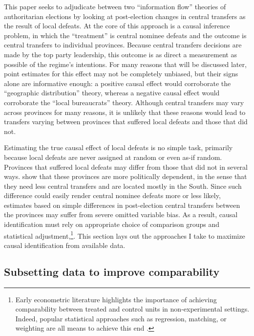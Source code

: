 \documentclass[12pt]{article}\usepackage[]{graphicx}\usepackage[]{color}
\newcommand{\1}{\mathbbm{1}}
\begin{document}
This paper seeks to adjudicate between two ``information flow'' theories of authoritarian elections by looking at post-election changes in central transfers as the result of local defeats. At the core of this approach is a causal inference problem, in which the ``treatment'' is central nominee defeats and the outcome is central transfers to individual provinces. Because central transfers decisions are made by the top party leadership, this outcome is as direct a measurement as possible of the regime's intentions. For many reasons that will be discussed later, point estimates for this effect may not be completely unbiased, but their signs alone are informative enough: a positive causal effect would corroborate the ``geographic distribution'' theory, whereas a negative causal effect would corroborate the ``local bureaucrats'' theory. Although central transfers may vary across provinces for many reasons, it is unlikely that these reasons would lead to transfers varying between provinces that suffered local defeats and those that did not. 

Estimating the true causal effect of local defeats is no simple task, primarily because local defeats are never assigned at random or even as-if random. Provinces that suffered local defeats may differ from those that did not in several ways. \cite{MaleskySchuler2011} show that these provinces are more politically dependent, in the sense that they need less central transfers and are located mostly in the South. Since such difference could easily render central nominee defeats more or less likely, estimates based on simple differences in post-election central transfers between the provinces may suffer from severe omitted variable bias. As a result, causal identification must rely on appropriate choice of comparison groups and statistical adjustment,\footnote{Early econometric literature highlights the importance of achieving comparability between treated and control units in non-experimental settings. Indeed, popular statistical approaches such as regression, matching, or weighting are all means to achieve this end \citep{Ashenfelter1978, AshenfelterCard1985, Lalonde1986, DehejiaWahba1999}.}. This section lays out the approaches I take to maximize causal identification from available data.

\subsection{Subsetting data to improve comparability}
\end{document}
